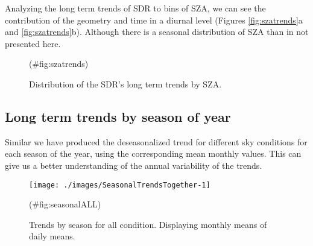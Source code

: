 \documentclass[preprint, 3p,
authoryear]{elsarticle} %
\begin{document}
Analyzing the long term trends of SDR to bins of SZA, we can see the
contribution of the geometry and time in a diurnal level (Figures
\ref{fig:szatrends}a and \ref{fig:szatrends}b). Although there is a
seasonal distribution of SZA than in not presented here.

\begin{figure}[h!]

{\centering {}

}

\caption{Distribution of the SDR's long term trends by SZA.}(\#fig:szatrends)
\end{figure}

\hypertarget{long-term-trends-by-season-of-year}{%
\subsection{Long term trends by season of
year}\label{long-term-trends-by-season-of-year}}

Similar we have produced the deseasonalized trend for different sky
conditions for each season of the year, using the corresponding mean
monthly values. This can give us a better understanding of the annual
variability of the trends.

\begin{figure}[h!]

{\centering \texttt{[image: ./images/SeasonalTrendsTogether-1]} 

}

\caption{Trends by season for all condition. Displaying monthly means of daily means.}(\#fig:seasonalALL)
\end{figure}
\end{document}
